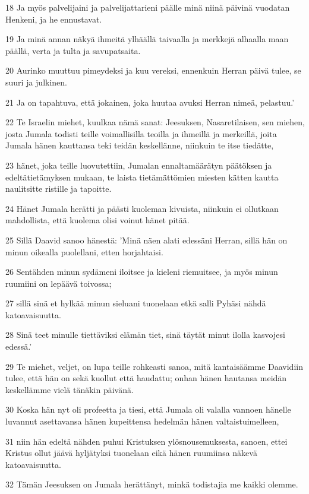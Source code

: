 \par 18 Ja myös palvelijaini ja palvelijattarieni päälle minä niinä päivinä vuodatan Henkeni, ja he ennustavat.
\par 19 Ja minä annan näkyä ihmeitä ylhäällä taivaalla ja merkkejä alhaalla maan päällä, verta ja tulta ja savupatsaita.
\par 20 Aurinko muuttuu pimeydeksi ja kuu vereksi, ennenkuin Herran päivä tulee, se suuri ja julkinen.
\par 21 Ja on tapahtuva, että jokainen, joka huutaa avuksi Herran nimeä, pelastuu.'
\par 22 Te Israelin miehet, kuulkaa nämä sanat: Jeesuksen, Nasaretilaisen, sen miehen, josta Jumala todisti teille voimallisilla teoilla ja ihmeillä ja merkeillä, joita Jumala hänen kauttansa teki teidän keskellänne, niinkuin te itse tiedätte,
\par 23 hänet, joka teille luovutettiin, Jumalan ennaltamäärätyn päätöksen ja edeltätietämyksen mukaan, te laista tietämättömien miesten kätten kautta naulitsitte ristille ja tapoitte.
\par 24 Hänet Jumala herätti ja päästi kuoleman kivuista, niinkuin ei ollutkaan mahdollista, että kuolema olisi voinut hänet pitää.
\par 25 Sillä Daavid sanoo hänestä: 'Minä näen alati edessäni Herran, sillä hän on minun oikealla puolellani, etten horjahtaisi.
\par 26 Sentähden minun sydämeni iloitsee ja kieleni riemuitsee, ja myös minun ruumiini on lepäävä toivossa;
\par 27 sillä sinä et hylkää minun sieluani tuonelaan etkä salli Pyhäsi nähdä katoavaisuutta.
\par 28 Sinä teet minulle tiettäviksi elämän tiet, sinä täytät minut ilolla kasvojesi edessä.'
\par 29 Te miehet, veljet, on lupa teille rohkeasti sanoa, mitä kantaisäämme Daavidiin tulee, että hän on sekä kuollut että haudattu; onhan hänen hautansa meidän keskellämme vielä tänäkin päivänä.
\par 30 Koska hän nyt oli profeetta ja tiesi, että Jumala oli valalla vannoen hänelle luvannut asettavansa hänen kupeittensa hedelmän hänen valtaistuimelleen,
\par 31 niin hän edeltä nähden puhui Kristuksen ylösnousemuksesta, sanoen, ettei Kristus ollut jäävä hyljätyksi tuonelaan eikä hänen ruumiinsa näkevä katoavaisuutta.
\par 32 Tämän Jeesuksen on Jumala herättänyt, minkä todistajia me kaikki olemme.
